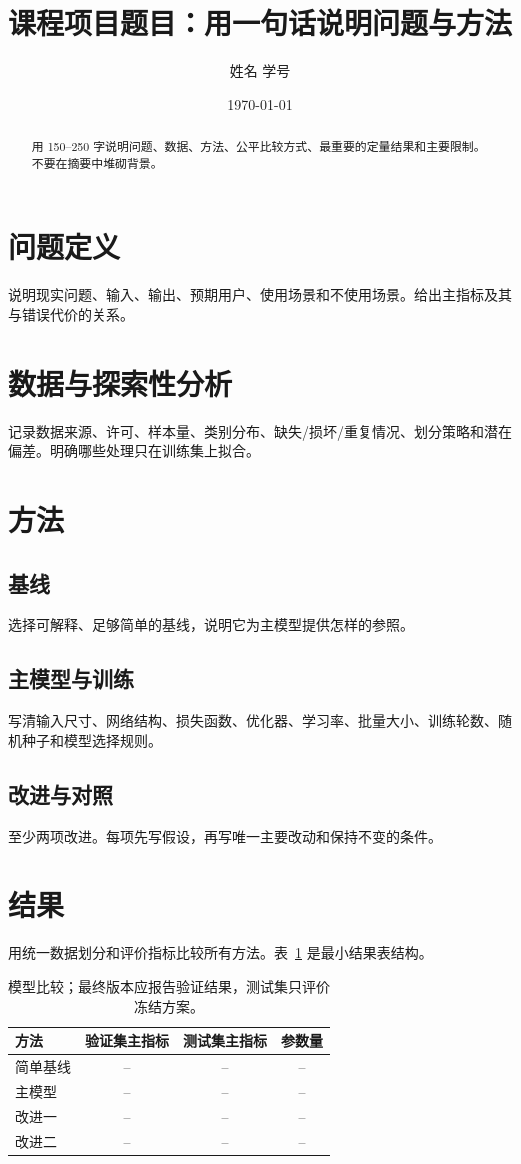 \documentclass[UTF8,12pt,a4paper]{ctexart}
\title{课程项目题目：用一句话说明问题与方法}
\author{姓名 \quad 学号}
\date{\today}
\begin{document}
\maketitle

\begin{abstract}
用 150--250 字说明问题、数据、方法、公平比较方式、最重要的定量结果和主要限制。不要在摘要中堆砌背景。
\end{abstract}

\section{问题定义}
说明现实问题、输入、输出、预期用户、使用场景和不使用场景。给出主指标及其与错误代价的关系。

\section{数据与探索性分析}
记录数据来源、许可、样本量、类别分布、缺失/损坏/重复情况、划分策略和潜在偏差。明确哪些处理只在训练集上拟合。

\section{方法}
\subsection{基线}
选择可解释、足够简单的基线，说明它为主模型提供怎样的参照。

\subsection{主模型与训练}
写清输入尺寸、网络结构、损失函数、优化器、学习率、批量大小、训练轮数、随机种子和模型选择规则。

\subsection{改进与对照}
至少两项改进。每项先写假设，再写唯一主要改动和保持不变的条件。

\section{结果}
用统一数据划分和评价指标比较所有方法。表~\ref{tab:results} 是最小结果表结构。

\begin{table}[ht]
  \centering
  \caption{模型比较；最终版本应报告验证结果，测试集只评价冻结方案。}
  \label{tab:results}
  \begin{tabular}{lccc}
    \toprule
    方法 & 验证集主指标 & 测试集主指标 & 参数量 \\
    \midrule
    简单基线 & -- & -- & -- \\
    主模型 & -- & -- & -- \\
    改进一 & -- & -- & -- \\
    改进二 & -- & -- & -- \\
    \bottomrule
  \end{tabular}
\end{table}
\end{document}
